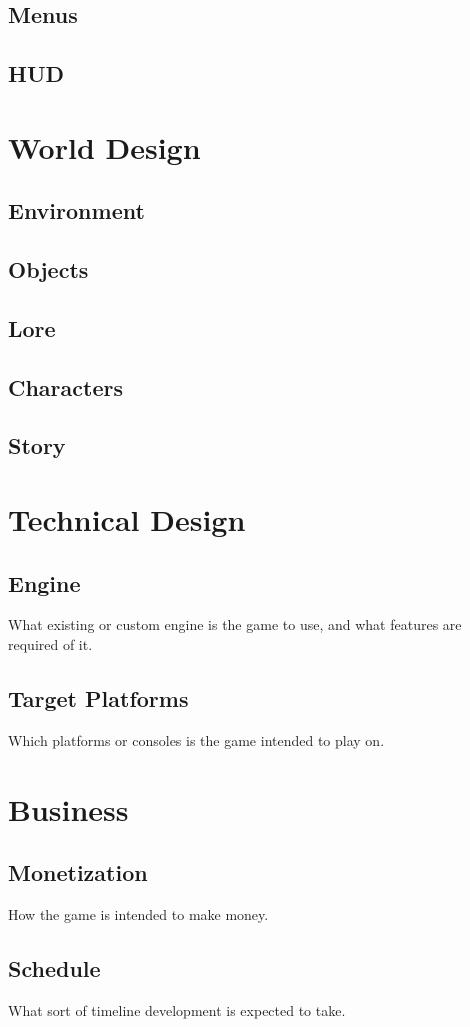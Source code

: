 \subsection{Menus}
\subsection{HUD}

\section{World Design}
\subsection{Environment}
\subsection{Objects}
\subsection{Lore}
\subsection{Characters}
\subsection{Story}

\section{Technical Design}
\subsection{Engine}
What existing or custom engine is the game to use, and what features are required of it.
\subsection{Target Platforms}
Which platforms or consoles is the game intended to play on.

\section{Business}
\subsection{Monetization}
How the game is intended to make money.
\subsection{Schedule}
What sort of timeline development is expected to take.

